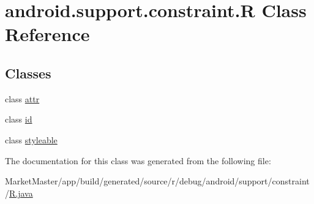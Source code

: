 \hypertarget{classandroid_1_1support_1_1constraint_1_1R}{}\section{android.\+support.\+constraint.\+R Class Reference}
\label{classandroid_1_1support_1_1constraint_1_1R}
\subsection*{Classes}
\begin{DoxyCompactItemize}
\item 
class \mbox{\hyperlink{classandroid_1_1support_1_1constraint_1_1R_1_1attr}{attr}}
\item 
class \mbox{\hyperlink{classandroid_1_1support_1_1constraint_1_1R_1_1id}{id}}
\item 
class \mbox{\hyperlink{classandroid_1_1support_1_1constraint_1_1R_1_1styleable}{styleable}}
\end{DoxyCompactItemize}


The documentation for this class was generated from the following file\+:\begin{DoxyCompactItemize}
\item 
Market\+Master/app/build/generated/source/r/debug/android/support/constraint/\mbox{\hyperlink{debug_2android_2support_2constraint_2R_8java}{R.\+java}}\end{DoxyCompactItemize}
